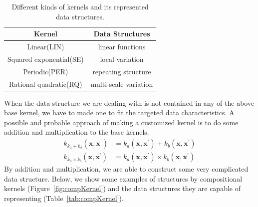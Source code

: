 \begin{table}[htp]
\centering
{\small
\begin{tabular}{c|c}
    \hline
    \textbf{Kernel} & \textbf{Data Structures} \\ 
    \hline
	   Linear(LIN) & linear functions\\
	   Squared exponential(SE) & local variation\\
	   Periodic(PER) & repeating structure\\
	   Rational quadratic(RQ) & multi-scale variation\\
	   \hline
\end{tabular}
}
\caption{Different kinds of kernels and its represented data structures.}
\label{tab:kernel}
\end{table}



When the data structure we are dealing with is not contained in any of the above base kernel, we have to made one to fit the targeted data characteristics. A possible and probable approach of making a customized kernel is to do some addition and multiplication to the base kernels.
\begin{align}
k_{k_{a} + k_{b}} (\textbf{x}, \textbf{x}^{'}) &= k_{a} (\textbf{x}, \textbf{x}^{'}) + k_{b} (\textbf{x}, \textbf{x}^{'}) \\
k_{k_{a} \times k_{b}} (\textbf{x}, \textbf{x}^{'}) &= k_{a} (\textbf{x}, \textbf{x}^{'}) \times k_{b} (\textbf{x}, \textbf{x}^{'})
\end{align}
By addition and multiplication, we are able to construct some very complicated data structure.
Below, we show some examples of structures by compositional kernels (Figure~\ref{fig:compKernel}) and the data structures they are capable of representing (Table~\ref{tab:compKernel}).


